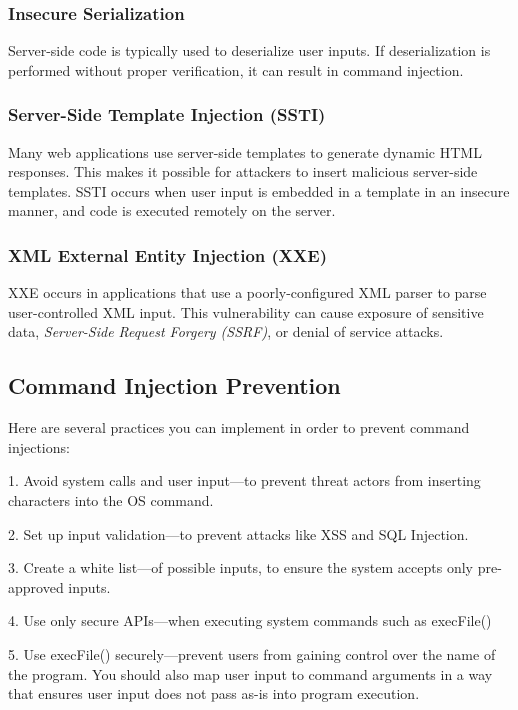 \subsubsection{Insecure Serialization}

Server-side code is typically used to deserialize user inputs. If deserialization is performed without proper verification, it can result in command injection.

\subsubsection{Server-Side Template Injection (SSTI)}

Many web applications use server-side templates to generate dynamic HTML responses. This makes it possible for attackers to insert malicious server-side templates. SSTI occurs when user input is embedded in a template in an insecure manner, and code is executed remotely on the server.

\subsubsection{XML External Entity Injection (XXE)}

XXE occurs in applications that use a poorly-configured XML parser to parse user-controlled XML input. This vulnerability can cause exposure of sensitive data, \textit{Server-Side Request Forgery (SSRF)}, or denial of service attacks.

\subsection{Command Injection Prevention}

Here are several practices you can implement in order to prevent command injections:

1. Avoid system calls and user input—to prevent threat actors from inserting characters into the OS command.

2. Set up input validation—to prevent attacks like XSS and SQL Injection.

3. Create a white list—of possible inputs, to ensure the system accepts only pre-approved inputs.

4. Use only secure APIs—when executing system commands such as execFile()

5. Use execFile() securely—prevent users from gaining control over the name of the program. You should also map user input to command arguments in a way that ensures user input does not pass as-is into program execution.

